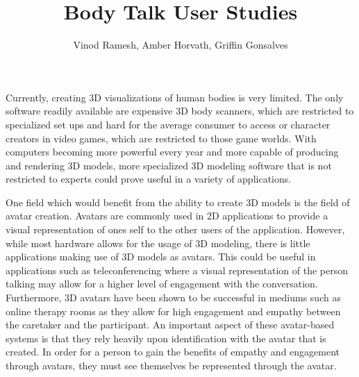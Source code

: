 \documentclass[journal]{vgtc}                %
\title{Body Talk User Studies}
\author{Vinod Ramesh, Amber Horvath, Griffin Gonsalves }
\begin{document}


\maketitle

\noindent Currently, creating 3D visualizations of human bodies is very limited. The only software readily available are expensive 3D body scanners,
which are restricted to specialized set ups and hard for the average consumer to access or character creators in video games, which are restricted to
those game worlds. With computers becoming more powerful every year and more capable of producing and rendering 3D models, more specialized 3D modeling
software that is not restricted to experts could prove useful in a variety of applications. \newline

\noindent One field which would benefit from the ability to create 3D models is the field
of avatar creation. Avatars are commonly used in 2D applications to provide a visual representation of ones self to the other users of the application.
However, while most hardware allows for the usage of 3D modeling, there is little applications making use of 3D models as avatars. This could be useful
in applications such as teleconferencing where a visual representation of the person talking may allow for a higher level of engagement with the
conversation. Furthermore, 3D avatars have been shown to be successful in mediums such as online therapy rooms as they allow for high engagement
and empathy between the caretaker and the participant\cite{Rijn:2015:BJGC}. An important aspect of these avatar-based systems is that they rely
heavily upon identification with the avatar that is created. In order for a person to gain the benefits of empathy and engagement through avatars,
they must see themselves be represented through the avatar\cite{Belisle:2010:PM}. \newline
\end{document}
